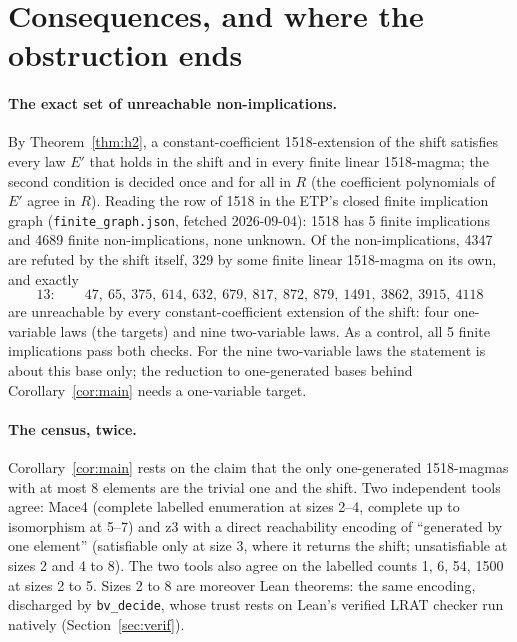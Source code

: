 \documentclass[11pt]{article}
\theoremstyle{remark}\newtheorem*{remark}{Remark}
\begin{document}
\section{Consequences, and where the obstruction ends}\label{sec:cons}

\paragraph{The exact set of unreachable non-implications.} By Theorem~\ref{thm:h2}, a constant-coefficient 1518-extension of the shift satisfies every law $E'$ that holds in the shift and in every finite linear 1518-magma; the second condition is decided once and for all in $R$ (the coefficient polynomials of $E'$ agree in $R$). Reading the row of 1518 in the ETP's closed finite implication graph (\texttt{finite\_graph.json}, fetched 2026-09-04): 1518 has 5 finite implications and 4689 finite non-implications, none unknown. Of the non-implications, 4347 are refuted by the shift itself, 329 by some finite linear 1518-magma on its own, and exactly
\[
13:\qquad 47,\ 65,\ 375,\ 614,\ 632,\ 679,\ 817,\ 872,\ 879,\ 1491,\ 3862,\ 3915,\ 4118
\]
are unreachable by every constant-coefficient extension of the shift: four one-variable laws (the targets) and nine two-variable laws. As a control, all 5 finite implications pass both checks. For the nine two-variable laws the statement is about this base only; the reduction to one-generated bases behind Corollary~\ref{cor:main} needs a one-variable target.

\paragraph{The census, twice.} Corollary~\ref{cor:main} rests on the claim that the only one-generated 1518-magmas with at most 8 elements are the trivial one and the shift. Two independent tools agree: Mace4 (complete labelled enumeration at sizes 2--4, complete up to isomorphism at 5--7) and z3 with a direct reachability encoding of ``generated by one element'' (satisfiable only at size 3, where it returns the shift; unsatisfiable at sizes 2 and 4 to 8). The two tools also agree on the labelled counts 1, 6, 54, 1500 at sizes 2 to 5. Sizes 2 to 8 are moreover Lean theorems: the same encoding, discharged by \texttt{bv\_decide}, whose trust rests on Lean's verified LRAT checker run natively (Section~\ref{sec:verif}).
\end{document}
